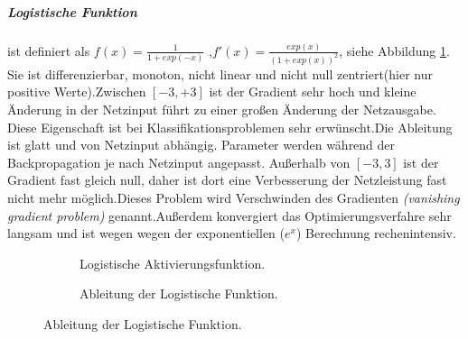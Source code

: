 \documentclass[12pt,a4paper]{scrartcl}
\numberwithin{equation}{section}
\begin{document}
\subparagraph{Logistische Funktion} ist definiert als $f(x)=\frac{1}{1+exp(-x)} $ ,$ f'(x)= \frac{exp(x)}{(1+exp(x))^2}$, siehe Abbildung \ref{fig:sigmoid}. Sie ist differenzierbar, monoton, nicht linear und nicht null zentriert(hier nur positive Werte).Zwischen $ [-3,+3] $ ist der Gradient sehr hoch und kleine Änderung in der Netzinput führt zu einer großen Änderung der Netzausgabe. Diese Eigenschaft ist bei Klassifikationsproblemen sehr erwünscht.Die Ableitung ist glatt und von Netzinput abhängig. Parameter werden während der Backpropagation je nach Netzinput angepasst.
Außerhalb von $ [-3,3]  $ ist der Gradient fast gleich null, daher ist dort eine Verbesserung der Netzleistung fast nicht mehr möglich.Dieses Problem wird Verschwinden des Gradienten \textit{(vanishing gradient problem)} genannt.Außerdem konvergiert das Optimierungsverfahre sehr langsam und ist wegen wegen der exponentiellen  ($ e^x $) Berechnung rechenintensiv.
\begin{figure}[h!]
	\caption{Logistische Aktivierungsfunktion:$ sigmoid(x) $.}
	\centering
	\begin{subfigure}{.5\textwidth}	
		\centering	
		\caption{Logistische Aktivierungsfunktion.}
		
	\end{subfigure}%
	\begin{subfigure}{.5\textwidth}	
		\centering	
		\caption{Ableitung der Logistische Funktion.}
	\end{subfigure}
	\label{fig:sigmoid}
	
\end{figure}
\end{document}
